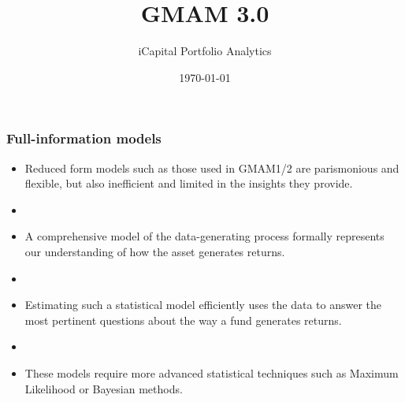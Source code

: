 \documentclass[10pt, compress]{beamer}
\author[Tepper]{iCapital Portfolio Analytics}
\title{\Large \bf GMAM 3.0}
\date{\today}
\begin{document}
\newcommand{\tstar}{\ensuremath{^\text{***}}}
\newcommand{\dstar}{\ensuremath{^\text{**}}}
\newcommand{\ostar}{\ensuremath{^\text{*}}}
\maketitle





\begin{frame}[fragile]
\frametitle{Full-information models} \label{fr:motivation}
\begin{itemize}
    \item Reduced form models such as those used in GMAM1/2 are parismonious and flexible, but also inefficient and limited in the insights they provide.
    \item []
    \item A comprehensive model of the data-generating process formally represents our understanding of how the asset generates returns.
    \item []
    \item Estimating such a statistical model efficiently uses the data to answer the most pertinent questions about the way a fund generates returns.
    \item []
    \item These models require more advanced statistical techniques such as Maximum Likelihood or Bayesian methods.
\end{itemize}
\end{frame}
\end{document}
